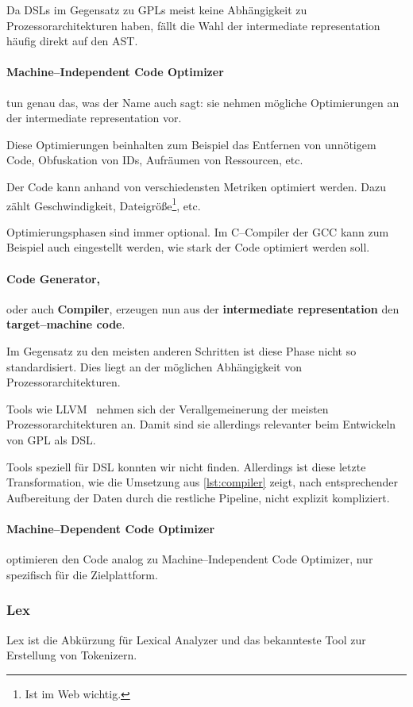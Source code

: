 Da \acp{DSL} im Gegensatz zu \acp{GPL} meist keine Abhängigkeit zu Prozessorarchitekturen haben, fällt die Wahl der intermediate representation häufig direkt auf den \ac{AST}.

\paragraph{Machine--Independent Code Optimizer} tun genau das, was der Name auch sagt: sie nehmen mögliche Optimierungen an der intermediate representation vor.

Diese Optimierungen beinhalten zum Beispiel das Entfernen von unnötigem Code, Obfuskation von \acp{ID}, Aufräumen von Ressourcen, etc.

Der Code kann anhand von verschiedensten Metriken optimiert werden.
Dazu zählt Geschwindigkeit, Dateigröße\footnote{Ist im Web wichtig.}, etc.

Optimierungsphasen sind immer optional.
Im C--Compiler der \ac{GCC} kann zum Beispiel auch eingestellt werden, wie stark der Code optimiert werden soll.~\autocite{gnu-project-no-date}

\paragraph{Code Generator,} oder auch \textbf{Compiler}, erzeugen nun aus der \textbf{intermediate representation} den \textbf{target--machine code}.

Im Gegensatz zu den meisten anderen Schritten ist diese Phase nicht so standardisiert.
Dies liegt an der möglichen Abhängigkeit von Prozessorarchitekturen.

Tools wie \ac{LLVM}~\autocite{llvm-project-2024} nehmen sich der Verallgemeinerung der meisten Prozessorarchitekturen an.
Damit sind sie allerdings relevanter beim Entwickeln von \ac{GPL} als \ac{DSL}.

Tools speziell für \ac{DSL} konnten wir nicht finden.
Allerdings ist diese letzte Transformation, wie die Umsetzung aus \autoref{lst:compiler} zeigt, nach entsprechender Aufbereitung der Daten durch die restliche Pipeline, nicht explizit kompliziert.

\paragraph{Machine--Dependent Code Optimizer} optimieren den Code analog zu Machine--Independent Code Optimizer, nur spezifisch für die Zielplattform.

\subsubsection{Lex}\label{subsubsec:lex}
Lex ist die Abkürzung für Lexical Analyzer und das bekannteste Tool zur Erstellung von Tokenizern.

